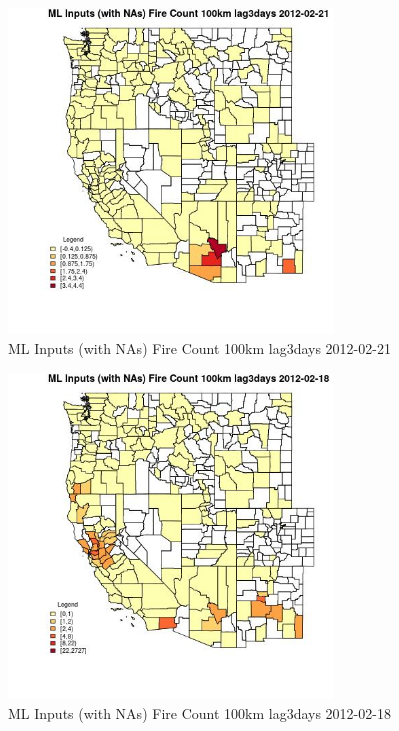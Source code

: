 \begin{figure} 
\centering  
\includegraphics[width=0.77\textwidth]{Code_Outputs/Report_ML_input_PM25_Step4_part_f_de_duplicated_aves_prioritize_24hr_obswNAs_CountyFire_Count_100km_lag3daysMean2012-02-21.jpg} 
\caption{\label{fig:Report_ML_input_PM25_Step4_part_f_de_duplicated_aves_prioritize_24hr_obswNAsCountyFire_Count_100km_lag3daysMean2012-02-21}ML Inputs (with NAs) Fire Count 100km lag3days 2012-02-21} 
\end{figure} 
 

\begin{figure} 
\centering  
\includegraphics[width=0.77\textwidth]{Code_Outputs/Report_ML_input_PM25_Step4_part_f_de_duplicated_aves_prioritize_24hr_obswNAs_CountyFire_Count_100km_lag3daysMean2012-02-18.jpg} 
\caption{\label{fig:Report_ML_input_PM25_Step4_part_f_de_duplicated_aves_prioritize_24hr_obswNAsCountyFire_Count_100km_lag3daysMean2012-02-18}ML Inputs (with NAs) Fire Count 100km lag3days 2012-02-18} 
\end{figure} 
 


